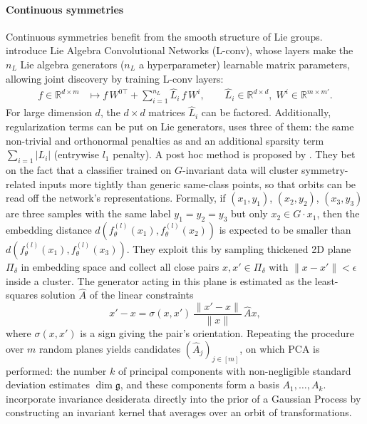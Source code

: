 \documentclass[mathematics,review,submit,moreauthors]{Definitions/mdpi}
\begin{document}
\paragraph{Continuous symmetries}
Continuous symmetries benefit from the smooth structure of Lie groups.
\citet{dehmamy2021anips} introduce Lie Algebra Convolutional Networks (L-conv), whose layers make the $n_L$ Lie algebra generators ($n_L$ a hyperparameter) learnable matrix parameters, allowing joint discovery by training L-conv layers:
\begin{equation}
    \begin{aligned}
        f \in \mathbb R^{d\times m} &\mapsto f\,W^{0\top} + \sum_{i=1}^{n_L} \hat L_i\, f\, W^i, \qquad \hat L_i \in \mathbb R^{d\times d},\; W^i \in \mathbb R^{m\times m'}.
    \end{aligned}
\end{equation}
For large dimension $d$, the $d\times d$ matrices $\hat L_i$ can be factored.
Additionally, regularization terms can be put on Lie generators, \citep{escriche2025} uses three of them: the same non-trivial and orthonormal penalties as \citet{yang2023p4icml} and an additional sparsity term $\sum_{i=1}|L_{i}|$ (entrywise $l_1$ penalty).
A post hoc method is proposed by \citet{krippendorf2020}.
They bet on the fact that a classifier trained on $G$-invariant data will cluster symmetry-related inputs more tightly than generic same-class points, so that orbits can be read off the network's representations.
Formally, if $(x_1, y_1)$, $(x_2, y_2)$, $(x_3, y_3)$ are three samples with the same label $y_1 = y_2 = y_3$ but only $x_2\in G\cdot x_1$, then the embedding distance $d(f_\theta^{(l)}(x_1), f_\theta^{(l)}(x_2))$ is expected to be smaller than $d(f_\theta^{(l)}(x_1), f_\theta^{(l)}(x_3))$.
They exploit this by sampling thickened 2D plane $\Pi_\delta$ in embedding space and collect all close pairs $x,x'\in\Pi_\delta$ with $\|x-x'\|<\epsilon$ inside a cluster.
The generator acting in this plane is estimated as the least-squares solution $\hat A$ of the linear constraints
\begin{equation*}
    x'-x=\sigma(x,x')\,\frac{\|x'-x\|}{\|x\|}\,\hat A x,
\end{equation*}
where $\sigma(x,x')$ is a sign giving the pair's orientation.
Repeating the procedure over $m$ random planes yields candidates $(\hat A_j)_{j\in[m]}$, on which PCA is performed: the number $k$ of principal components with non-negligible standard deviation estimates $\dim\mathfrak{g}$, and these components form a basis $A_1,\dots,A_k$.
\citet{vanderwilk2018anips} incorporate invariance desiderata directly into the prior of a Gaussian Process by constructing an invariant kernel that averages over an orbit of transformations.
\end{document}
